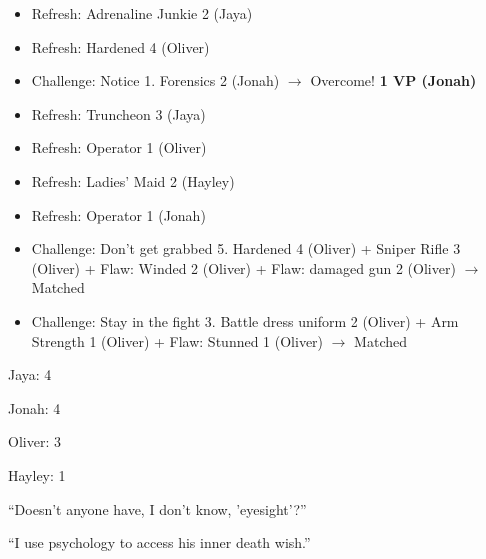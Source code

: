 \begin{itemize}
\item Refresh: Adrenaline Junkie 2 (Jaya)
\item Refresh: Hardened 4 (Oliver)
\item Challenge: Notice 1.  Forensics 2 (Jonah) $\rightarrow$ Overcome! \textbf{1 VP (Jonah)}
\item Refresh: Truncheon 3 (Jaya)
\item Refresh: Operator 1 (Oliver)
\item Refresh: Ladies' Maid 2 (Hayley)
\item Refresh: Operator 1 (Jonah)
\item Challenge: Don't get grabbed 5.  Hardened 4 (Oliver) + Sniper Rifle 3 (Oliver) +  {\color[RGB]{255,0,0}Flaw: Winded 2 (Oliver)}  +  {\color[RGB]{255,0,0}Flaw: damaged gun 2 (Oliver)}  $\rightarrow$ Matched
\item Challenge: Stay in the fight 3.  Battle dress uniform 2 (Oliver) + Arm Strength 1 (Oliver) +  {\color[RGB]{255,0,0}Flaw: Stunned 1 (Oliver)}  $\rightarrow$ Matched
\end{itemize}






{
\parskip=0pt
Jaya: 4

Jonah: 4

Oliver: 3

Hayley: 1
}






``Doesn't anyone have, I don't know, 'eyesight'?'' 




``I use psychology to access his inner death wish.'' 




